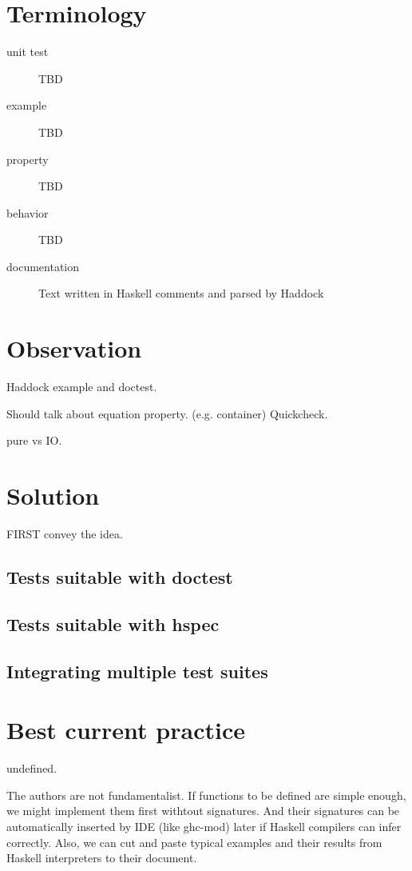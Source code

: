 \documentclass[preprint]{sigplanconf}
\begin{document}
\section{Terminology}

\begin{description}
\item[unit test] TBD
\item[example] TBD
\item[property] TBD
\item[behavior] TBD
\item[documentation] Text written in Haskell comments and parsed by Haddock
\end{description}

\section{Observation}

Haddock example and doctest.

Should talk about equation property. (e.g. container)
Quickcheck.

pure vs IO.

\section{Solution}

FIRST convey the idea.

\subsection{Tests suitable with doctest}

\subsection{Tests suitable with hspec}

\subsection{Integrating multiple test suites}

\section{Best current practice}

undefined.

The authors are not fundamentalist.
If functions to be defined are simple enough,
we might implement them first withtout signatures.
And their signatures can be automatically
inserted by IDE (like ghc-mod) later
if Haskell compilers can infer correctly.
Also, we can cut and paste typical examples and their results
from Haskell interpreters to their document.
\end{document}
